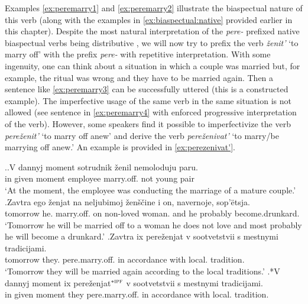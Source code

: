 Examples \ref{ex:peremarry1} and \ref{ex:peremarry2} illustrate the biaspectual nature  of this verb (along with the examples in \ref{ex:biaspectual:native} provided earlier in this chapter). Despite the most natural interpretation of the \textit{pere-}  prefixed native biaspectual verbs   being distributive , we will now try to prefix the verb \textit{\v{z}enit'} `to marry off' with the prefix \textit{pere-}   with repetitive  interpretation. With some ingenuity, one can think about a situation in which a couple was married but, for example, the ritual was wrong and they have to be married again. Then a sentence like \ref{ex:peremarry3} can be successfully uttered (this is a constructed example). The imperfective usage of the same verb in the same situation is not allowed (see sentence in \ref{ex:peremarry4} with enforced progressive interpretation  of the verb). However, some speakers find it possible to imperfectivize the verb \textit{pere\v{z}enit'} `to marry off anew' and derive the verb \textit{pere\v{z}enivat'} `to marry/be marrying off anew.' An example is provided in \ref{ex:perezenivat'}. 

\ex.\ag.\label{ex:peremarry1}V dannyj moment sotrudnik \v{z}enil\textsuperscript{\IPF} nemoloduju paru.\\
in given moment employee marry.off. {not young} pair\\
\trans `At the moment, the employee was conducting the marriage of a mature couple.'
\bg.\label{ex:peremarry2}Zavtra ego \v{z}enjat\textsuperscript{\PF} na neljubimoj \v{z}en\v{s}\v{c}ine i on, navernoje, sop'\"{e}tsja.\\
tomorrow he. marry.off. on non-loved woman. and he probably {become.drunkard.}\\
\trans `Tomorrow he will be married off to a woman he does not love and most probably he will become a drunkard.'
\bg.\label{ex:peremarry3}Zavtra ix pere\v{z}enjat\textsuperscript{\PF} v sootvetstvii s mestnymi tradicijami.\\
tomorrow they. pere.marry.off. in accordance with local. tradition.\\
\trans `Tomorrow they will be married again according to the local traditions.'
\bg.*V dannyj moment ix pere\v{z}enjat$^{*{\textsc{ipf}}}$ v sootvetstvii s mestnymi tradicijami.\label{ex:peremarry4}\\
in given moment they pere.marry.off. in accordance with local. tradition.\\

